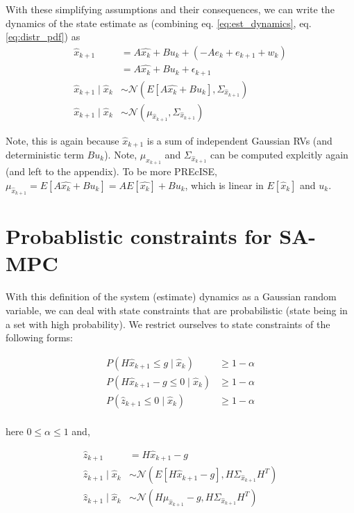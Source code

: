 \documentclass{article}[14pt]
\begin{document}
	With these simplifying assumptions and their consequences, we can write the dynamics of the state estimate as (combining eq. \ref{eq:est_dynamics}, eq. \ref{eq:distr_pdf}) as
	\begin{subequations}
	\label{eq:xkp1_distr}
		\begin{align}
			\hat{x}_{k+1} &= A\hat{x_k}+ Bu_k + (-Ae_{k}+e_{k+1}+w_k) \nonumber \\
									 &= A\hat{x_k}+ Bu_k + \epsilon_{k+1} \nonumber \\
			\hat{x}_{k+1}\mid\hat{x}_k &\sim \mathcal{N}(E[A\hat{x_k}+Bu_k], \Sigma_{\hat{x}_{k+1}}) \nonumber \\
			\hat{x}_{k+1}\mid\hat{x}_k &\sim \mathcal{N}(\mu_{\hat{x}_{k+1}}, \Sigma_{\hat{x}_{k+1}})						
		\end{align}
	\end{subequations}

	Note, this is again because $\hat{x}_{k+1}$ is a sum of independent Gaussian RVs (and deterministic term $Bu_k$). Note, $\mu_{x_{k+1}}$ and $\Sigma_{\hat{x}_{k+1}}$ can be computed explcitly again (and left to the appendix). To be more PREcISE, $\mu_{\hat{x}_{k+1}} = E[A\hat{x_k}+Bu_k] = AE[\hat{x_k}]+Bu_k$, which is linear in $E[\hat{x}_k]$ and $u_k$.

	\section{Probablistic constraints for SA-MPC}
	With this definition of the system (estimate) dynamics as a Gaussian random variable, we can deal with state constraints that are probabilistic (state being in a set with high probability). We restrict ourselves to state constraints of the following forms:

	\begin{subequations}
		\begin{align}
			P(H\hat{x}_{k+1}\leq g\mid\hat{x}_k ) &\geq 1-\alpha \nonumber \\
			P(H\hat{x}_{k+1}-g\leq 0\mid\hat{x}_k) &\geq 1-\alpha \nonumber \\
			P(\hat{z}_{k+1}\leq0\mid\hat{x}_k) &\geq 1-\alpha \nonumber \\
		\end{align}
		\label{eq:constraint_form}	
	\end{subequations}

	here $0\leq\alpha\leq1$ and, 

	\begin{subequations}
		\begin{align}
			\hat{z}_{k+1} &= H\hat{x}_{k+1}-g \nonumber \\
			\hat{z}_{k+1}\mid\hat{x}_k &\sim \mathcal{N}(E[H\hat{x}_{k+1}-g],H\Sigma_{\hat{x}_{k+1}}H^{T}) \nonumber \\
			\hat{z}_{k+1}\mid\hat{x}_k &\sim \mathcal{N}(H\mu_{\hat{x}_{k+1}}-g,H\Sigma_{\hat{x}_{k+1}}H^{T})
		\end{align}
		\label{eq:pdf_constraint}
	\end{subequations}
\end{document}
